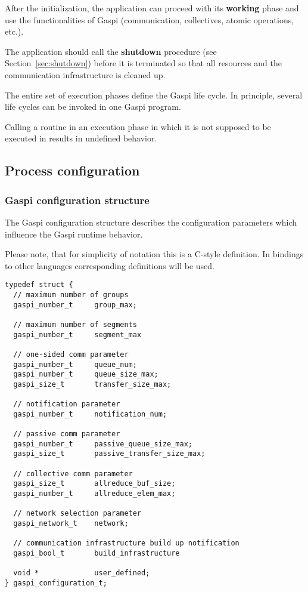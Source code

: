 \documentclass[a4paper]{article}
\makeatletter
\newlength{\st}\setlength{\st}{0pt}
\newcommand{\GASPI}{{\sc Gaspi}}
\newcommand{\finalsymb}[1]{\leavevmode\unskip\penalty9999\hbox{}\nobreak\hfill\hskip 1em minus 0.5em\hbox{#1}}
\newcounter{counttodo}
\newlength{\savetabcolsep}
\newlength{\savearrayrulewidth}
\newenvironment{todo}
{\stepcounter{counttodo}
 \typeout{Environment TODO call \thecounttodo}
 \setlength{\savetabcolsep}{\tabcolsep}
 \setlength{\savearrayrulewidth}{\arrayrulewidth}
 \renewcommand{\tabcolsep}{0pt}
 \renewcommand{\arrayrulewidth}{2pt}
 \begin{center}
 \begin{tabular}{c|l@{\hspace*{2em}}|@{\hspace*{2em}}c}
 &
 \begin{minipage}{0.66\textwidth}
 \begin{itemize}
}
{\end{itemize}
 \end{minipage}
 &  todo \#\thecounttodo
 \end{tabular} \marginpar{$\Longleftarrow$}
 \end{center}
 \renewcommand{\tabcolsep}{\savetabcolsep}
 \renewcommand{\arrayrulewidth}{\savearrayrulewidth}
}
\newenvironment{useradvice}{\begin{flushright}\begin{minipage}[t]{0.9\linewidth}\emph{User advice:}}{\finalsymb{$\lrcorner$}\end{minipage}\end{flushright}}
\makeatother
\begin{document}
After the initialization, the application can proceed with its
\textbf{working} phase and use the functionalities of \GASPI{} (communication,
collectives, atomic operations, etc.).

The application should call the
\textbf{shutdown} procedure (see Section~\ref{sec:shutdown}) before it is terminated
so that all resources and the communication infrastructure is cleaned up.

The entire set of execution phases define the \GASPI{} life cycle.
In principle, several life cycles can be invoked in one \GASPI{}
program.

Calling a routine in an execution phase in which it is not supposed
to be executed in results in undefined behavior.

\subsection{Process configuration}

\subsubsection{\GASPI{} configuration structure}
\label{subsubsec:confstruct}

The \GASPI{} configuration structure describes the configuration parameters which
influence the \GASPI{} runtime behavior.

Please note, that for simplicity of notation this is a C-style
definition. In bindings to other languages corresponding definitions
will be used.


\begin{lstlisting}[caption=GASPI configuration structure.]
typedef struct {
  // maximum number of groups
  gaspi_number_t     group_max;

  // maximum number of segments
  gaspi_number_t     segment_max

  // one-sided comm parameter
  gaspi_number_t     queue_num;
  gaspi_number_t     queue_size_max;
  gaspi_size_t       transfer_size_max;

  // notification parameter
  gaspi_number_t     notification_num;

  // passive comm parameter
  gaspi_number_t     passive_queue_size_max;
  gaspi_size_t       passive_transfer_size_max;

  // collective comm parameter
  gaspi_size_t       allreduce_buf_size;
  gaspi_number_t     allreduce_elem_max;

  // network selection parameter
  gaspi_network_t    network;

  // communication infrastructure build up notification
  gaspi_bool_t       build_infrastructure

  void *             user_defined;
} gaspi_configuration_t;
\end{lstlisting}
\end{document}
